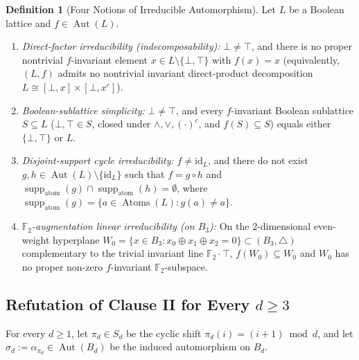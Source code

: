 \documentclass[11pt]{article}
\theoremstyle{definition}
\newtheorem{definition}[theorem]{Definition}
\theoremstyle{remark}
\newcommand{\Aut}{\operatorname{Aut}}
\newcommand{\Atoms}{\operatorname{Atoms}}
\newcommand{\supp}{\operatorname{supp}}
\newcommand{\id}{\mathrm{id}}
\newcommand{\Ftwo}{\mathbb{F}_2}
\begin{document}
\begin{definition}[Four Notions of Irreducible Automorphism]
\label{def:irreducible}
Let $L$ be a Boolean lattice and $f \in \Aut(L)$.
\begin{enumerate}
  \item[\textbf{(I1)}] \emph{Direct-factor irreducibility (indecomposability):} $\bot \neq \top$, and there is no proper nontrivial $f$-invariant element $x \in L \setminus \{\bot, \top\}$ with $f(x) = x$ (equivalently, $(L, f)$ admits no nontrivial invariant direct-product decomposition $L \cong [\bot, x] \times [\bot, x^c]$).
  \item[\textbf{(I2)}] \emph{Boolean-sublattice simplicity:} $\bot \neq \top$, and every $f$-invariant Boolean sublattice $S \subseteq L$ ($\bot, \top \in S$, closed under $\wedge, \vee, (\cdot)^c$, and $f(S) \subseteq S$) equals either $\{\bot, \top\}$ or $L$.
  \item[\textbf{(I3)}] \emph{Disjoint-support cycle irreducibility:} $f \neq \id_L$, and there do not exist $g, h \in \Aut(L) \setminus \{\id_L\}$ such that $f = g \circ h$ and $\supp_{\mathrm{atom}}(g) \cap \supp_{\mathrm{atom}}(h) = \emptyset$, where $\supp_{\mathrm{atom}}(g) = \{a \in \Atoms(L) : g(a) \neq a\}$.
  \item[\textbf{(I4)}] \emph{$\Ftwo$-augmentation linear irreducibility (on $B_3$):} On the $2$-dimensional even-weight hyperplane $W_0 = \{x \in B_3 : x_0 \oplus x_1 \oplus x_2 = 0\} \subset (B_3, \triangle)$ complementary to the trivial invariant line $\Ftwo \cdot \top$, $f(W_0) \subseteq W_0$ and $W_0$ has no proper non-zero $f$-invariant $\Ftwo$-subspace.
\end{enumerate}
\end{definition}

\subsection{Refutation of Clause II for Every \texorpdfstring{$d \ge 3$}{d >= 3}}

For every $d \ge 1$, let $\pi_d \in S_d$ be the cyclic shift $\pi_d(i) = (i + 1) \bmod d$, and let $\sigma_d := \alpha_{\pi_d} \in \Aut(B_d)$ be the induced automorphism on $B_d$.
\end{document}
